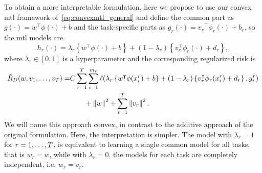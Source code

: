 To obtain a more interpretable formulation, here we propose to use our convex \acrshort{mtl} framework of~\eqref{eq:convexmtl_general} and define the common part as $g(\cdot) =  {w}^\intercal {\phi(\cdot)} + b$ and the task-specific parts as $g_r(\cdot) = {v_r}^\intercal {\phi_r(\cdot)} + b_r$, so the \acrshort{mtl} models are
\begin{equation}
    \nonumber
    \label{eq:convexmtl_modeldef}
    h_r(\cdot) = \lambda_r \left\lbrace {w}^\intercal {\phi(\cdot)} + b \right\rbrace + (1 - \lambda_r) \left\lbrace {v}_r^\intercal {\phi_r(\cdot)} + d_r \right\rbrace ,
\end{equation}
where $\lambda_r \in \left[0, 1\right]$ is a hyperparameter and the corresponding regularized risk is 
\begin{equation}
    \nonumber
    \begin{aligned}
        \hat{R}_{D} ({w, v_1, \ldots, v_T}) = &C \sum_{r=1}^{T} \sum_{i=1}^{m_r} \ell(\lambda_r \left\lbrace {w}^\intercal {\phi(x_i^r)} + b \right\rbrace + (1 - \lambda_r) \left\lbrace {v}_r^\intercal {\phi_r(x_i^r)} + d_r \right\rbrace, y_i^r) \\ 
        &\qquad + \left\lVert{w}\right\rVert^2 + \sum_{r=1}^T \left\lVert{v}_r\right\rVert^2 .
    \end{aligned}
\end{equation}
We will name this approach {convex}, in contrast to the {additive} approach of the original formulation.
Here, the interpretation is simpler. The model with $\lambda_r = 1$ for $r=1, \ldots, T$, is equivalent to learning a single common model for all tasks, that is ${w}_r = {w}$, while with $\lambda_r=0$, the models for each task are completely independent, i.e. ${w}_r = {v}_r$.
%


